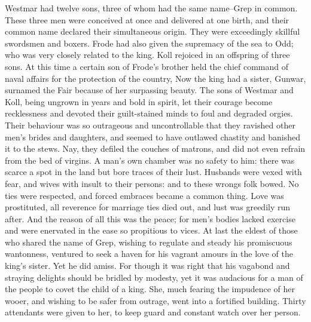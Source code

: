 \documentclass[10pt,a4paper]{report}
\begin{document}
Westmar had twelve sons, three of whom had the same name--Grep in common. These three men were conceived at once and delivered at one birth, and their common name declared their simultaneous origin. They were exceedingly skillful swordsmen and boxers. Frode had also given the supremacy of the sea to Odd; who was very closely related to the king. Koll rejoiced in an offspring of three sons. At this time a certain son of Frode's brother held the chief command of naval affairs for the protection of the country, Now the king had a sister, Gunwar, surnamed the Fair because of her surpassing beauty. The sons of Westmar and Koll, being ungrown in years and bold in spirit, let their courage become recklessness and devoted their guilt-stained minds to foul and degraded orgies.\\

Their behaviour was so outrageous and uncontrollable that they ravished other men's brides and daughters, and seemed to have outlawed chastity and banished it to the stews. Nay, they defiled the couches of matrons, and did not even refrain from the bed of virgins. A man's own chamber was no safety to him: there was scarce a spot in the land but bore traces of their lust. Husbands were vexed with fear, and wives with insult to their persons: and to these wrongs folk bowed. No ties were respected, and forced embraces became a common thing. Love was prostituted, all reverence for marriage ties died out, and lust was greedily run after. And the reason of all this was the peace; for men's bodies lacked exercise and were enervated in the ease so propitious to vices. At last the eldest of those who shared the name of Grep, wishing to regulate and steady his promiscuous wantonness, ventured to seek a haven for his vagrant amours in the love of the king's sister. Yet he did amiss. For though it was right that his vagabond and straying delights should be bridled by modesty, yet it was audacious for a man of the people to covet the child of a king. She, much fearing the impudence of her wooer, and wishing to be safer from outrage, went into a fortified building. Thirty attendants were given to her, to keep guard and constant watch over her person.\\
\end{document}
